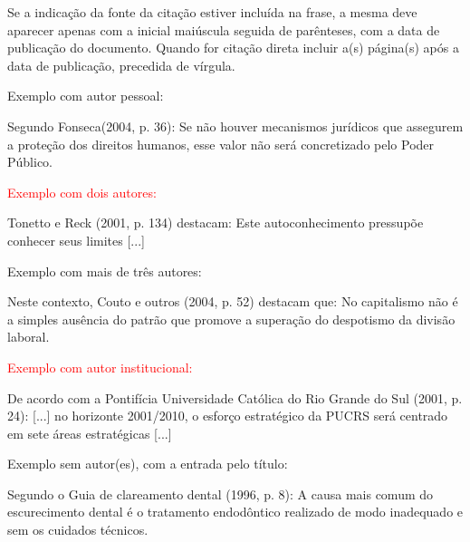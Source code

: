 \bigskip

{\sffamily
\textrm{Se a indicação da fonte da citação estiver incluída na frase, a mesma deve aparecer apenas com a inicial
maiúscula seguida de parênteses, com a data de publicação do }\textrm{documento. Quando for citação direta incluir a(s)
página(s) após a data de publicação, precedida de vírgula.}}

\bigskip

{\color{red}
Exemplo com autor pessoal:}

\bigskip

Segundo Fonseca(2004, p. 36): {\textquotedbl}Se não houver mecanismos jurídicos que assegurem a proteção dos direitos
humanos, esse valor não será concretizado pelo Poder Público.{\textquotedbl}\\

\bigskip

{\sffamily
\textrm{\textcolor{red}{Exemplo com dois autores: }}}

\bigskip

Tonetto e Reck (2001, p. 134) destacam: {\textquotedbl}Este autoconhecimento pressupõe conhecer seus limites
[...]{\textquotedbl} \\

\bigskip

{\color{red}
Exemplo com mais de três autores:}

\bigskip

Neste contexto, Couto e outros (2004, p. 52) destacam que: {\textquotedbl}No capitalismo não é a simples ausência do
patrão que promove a superação do despotismo da divisão laboral.{\textquotedbl}\\

\bigskip

{\sffamily
\textrm{\textcolor{red}{Exemplo com autor institucional: }}}

\bigskip

De acordo com a Pontifícia Universidade Católica do Rio Grande do Sul (2001, p. 24): {\textquotedbl}[...] no horizonte 2001/2010, o esforço estratégico da PUCRS será centrado em sete áreas estratégicas [...]{\textquotedbl}\\

\bigskip

{\color{red}
Exemplo sem autor(es), com a entrada pelo título:}

\bigskip

Segundo o Guia de clareamento dental (1996, p. 8): {\textquotedbl}A causa mais comum do escurecimento dental é o tratamento endodôntico realizado de modo inadequado e sem os cuidados técnicos.{\textquotedbl}\\


